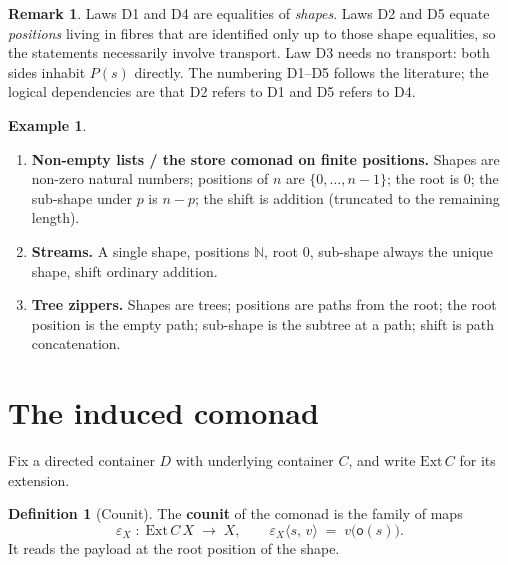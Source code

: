\documentclass[11pt,a4paper]{article}
\theoremstyle{plain}
\theoremstyle{definition}
\newtheorem{definition}[theorem]{Definition}
\newtheorem{example}[theorem]{Example}
\newtheorem{remark}[theorem]{Remark}
\newcommand{\Ext}{\mathrm{Ext}}
\newcommand{\rootpos}{\mathsf{o}}
\begin{document}
\begin{remark}
Laws D1 and D4 are equalities of \emph{shapes}. Laws D2 and D5 equate
\emph{positions} living in fibres that are identified only up to those shape
equalities, so the statements necessarily involve transport. Law D3 needs no
transport: both sides inhabit $P(s)$ directly. The numbering D1--D5 follows
the literature; the logical dependencies are that D2 refers to D1 and D5
refers to D4.
\end{remark}

\begin{example}
\begin{enumerate}
  \item \textbf{Non-empty lists / the store comonad on finite positions.}
        Shapes are non-zero natural numbers; positions of $n$ are
        $\{0,\ldots,n-1\}$; the root is $0$; the sub-shape under $p$ is
        $n-p$; the shift is addition (truncated to the remaining length).
  \item \textbf{Streams.} A single shape, positions $\mathbb{N}$, root $0$,
        sub-shape always the unique shape, shift ordinary addition.
  \item \textbf{Tree zippers.} Shapes are trees; positions are paths from
        the root; the root position is the empty path; sub-shape is the
        subtree at a path; shift is path concatenation.
\end{enumerate}
\end{example}

\section{The induced comonad}

Fix a directed container $D$ with underlying container $C$, and write
$\Ext\,C$ for its extension.

\begin{definition}[Counit]\label{def:counit}
The \textbf{counit} of the comonad is the family of maps
\begin{equation}
  \varepsilon_X \;:\; \Ext\,C\,X \;\longrightarrow\; X,
  \qquad
  \varepsilon_X\langle s,\,v\rangle \;=\; v\bigl(\rootpos(s)\bigr).
\end{equation}
It reads the payload at the root position of the shape.
\end{definition}
\end{document}
